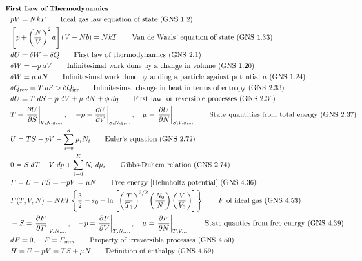 \documentclass[10pt]{article}
\newcommand{\pder}[2]{\frac{\partial #1}{\partial #2}}
\newcommand{\lrp}[1]{\left( #1 \right)}
\newcommand{\lrb}[1]{\left[ #1 \right]}
\newcommand{\lrc}[1]{\left\{ #1 \right\}}
\newcommand{\evalb}[1]{\left. #1 \right|}
\begin{document}
\begin{multicols}{2}
	\tiny
	\setlength{\abovedisplayskip}{-25pt}
	\setlength{\belowdisplayskip}{-25pt}
	\setlength{\abovedisplayshortskip}{0pt}
	\setlength{\belowdisplayshortskip}{0pt}
	\begin{align*}		
	& \small \hspace{-7pt} \textbf{First Law of Thermodynamics} \small \\
		& p V = NkT		\tag*{Ideal gas law equation of state (GNS 1.2)} \\
		& \lrb{p + \lrp{\frac{N}{V}}^2a}(V - Nb) = NkT	\tag*{Van de Waals' equation of state (GNS 1.33)} \\
		& dU = \delta W + \delta Q	\tag*{First law of thermodynamics (GNS 2.1)} \\
		& \delta W = - p \: dV	\tag*{Infinitesimal work done by a change in volume (GNS 1.20)} \\
		& \delta W = \mu \: dN	\tag*{Infinitesimal work done by adding a particle against potential $\mu$ (GNS 1.24)} \\
		& \delta Q_{\text{rev}} = T \: dS > \delta Q_{\text{irr}}	\tag*{Infinitesimal change in heat in terms of entropy (GNS 2.33)} \\
		& dU = T \; dS - p \; dV + \mu \; dN + \phi \; dq	\tag*{First law for reversible processes (GNS 2.36)} \\
		& T =  \left. \pder{U}{S} \right|_{V,N,q,...}, \quad \left. -p = \pder{U}{V}\right|_{S,N,q,...}, \quad \mu = \left. \pder{U}{N} \right|_{S,V,q,...}	\tag*{State quantities from total energy (GNS 2.37)} \\
		& U = TS - pV + \sum_{i=0}^K \mu_i N_i	\tag*{Euler's equation (GNS 2.72)} \\
		& 0 = S \; dT -V \; dp + \sum_{i=0}^K N_i \; d\mu_i	\tag*{Gibbs-Duhem relation (GNS 2.74)} \\
		& F = U - TS = -pV = \mu N	\tag*{Free energy [Helmholtz potential] (GNS 4.36)} \\
		& F(T,V,N) = NkT \lrc{\frac{3}{2} - s_0 - \ln \lrb{ \lrp{\frac{T}{T_0}}^{3/2} \lrp{\frac{N_0}{N}} \lrp{\frac{V}{V_0}} }} \tag*{$F$ of ideal gas (GNS 4.53)} \\
		& -S = \evalb{\pder{F}{T}}_{V,N,...}, \quad -p = \evalb{\pder{F}{V}}_{T,N,...}, \quad \mu = \evalb{\pder{F}{N}}_{T,V,...}	\tag*{State quanties from free energy (GNS 4.39)} \\
		& dF = 0, \quad F=F_{min}	\tag*{Property of irreversible processes (GNS 4.50)} \\
		& H = U + pV = TS + \mu N	\tag*{Definition of enthalpy (GNS 4.59)} \\

\end{align*}
\end{multicols}
\end{document}

